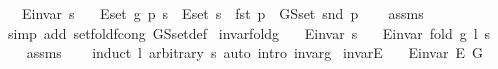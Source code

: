 \begin{isabellebody}
\ \ \ {\isachardoublequoteopen}E{\isachardot}{\kern0pt}invar\ s{\isachardoublequoteclose}\isanewline
\ \ \ {\isachardoublequoteopen}E{\isachardot}{\kern0pt}set\ {\isacharparenleft}{\kern0pt}g\ p\ s{\isacharparenright}{\kern0pt}\ {\isacharequal}{\kern0pt}\ E{\isachardot}{\kern0pt}set\ s\ {\isasymunion}\ {\isacharbraceleft}{\kern0pt}fst\ p{\isacharbraceright}{\kern0pt}\ {\isasymtimes}\ G{\isachardot}{\kern0pt}S{\isachardot}{\kern0pt}set\ {\isacharparenleft}{\kern0pt}snd\ p{\isacharparenright}{\kern0pt}{\isachardoublequoteclose}%
\endisataginvisible
{\isafoldinvisible}%
%
\isadeliminvisible
%
\endisadeliminvisible
\isanewline
%
\isadelimproof
\ \ %
\endisadelimproof
%
\isatagproof
{}\isamarkupfalse%
\ assms\isanewline
\ \ \isamarkupfalse%
\ {\isacharparenleft}{\kern0pt}simp\ add{\isacharcolon}{\kern0pt}\ set{\isacharunderscore}{\kern0pt}fold{\isacharunderscore}{\kern0pt}f{\isacharunderscore}{\kern0pt}cong\ G{\isachardot}{\kern0pt}S{\isachardot}{\kern0pt}set{\isacharunderscore}{\kern0pt}def{\isacharparenright}{\kern0pt}%
\endisatagproof
{\isafoldproof}%
%
\isadelimproof
%
\endisadelimproof
\isanewline
%
\isadeliminvisible
\isanewline
%
\endisadeliminvisible
%
\isataginvisible
{}\isamarkupfalse%
\ invar{\isacharunderscore}{\kern0pt}fold{\isacharunderscore}{\kern0pt}g{\isacharcolon}{\kern0pt}\isanewline
\ \ \ {\isachardoublequoteopen}E{\isachardot}{\kern0pt}invar\ s{\isachardoublequoteclose}\isanewline
\ \ \ {\isachardoublequoteopen}E{\isachardot}{\kern0pt}invar\ {\isacharparenleft}{\kern0pt}fold\ g\ l\ s{\isacharparenright}{\kern0pt}{\isachardoublequoteclose}%
\endisataginvisible
{\isafoldinvisible}%
%
\isadeliminvisible
%
\endisadeliminvisible
\isanewline
%
\isadelimproof
\ \ %
\endisadelimproof
%
\isatagproof
{}\isamarkupfalse%
\ assms\isanewline
\ \ \isamarkupfalse%
\ {\isacharparenleft}{\kern0pt}induct\ l\ arbitrary{\isacharcolon}{\kern0pt}\ s{\isacharparenright}{\kern0pt}\ {\isacharparenleft}{\kern0pt}auto\ intro{\isacharcolon}{\kern0pt}\ invar{\isacharunderscore}{\kern0pt}g{\isacharparenright}{\kern0pt}%
\endisatagproof
{\isafoldproof}%
%
\isadelimproof
%
\endisadelimproof
\isanewline
%
\isadeliminvisible
\isanewline
%
\endisadeliminvisible
%
\isataginvisible
{}\isamarkupfalse%
\ invar{\isacharunderscore}{\kern0pt}E{\isacharcolon}{\kern0pt}\isanewline
\ \ \ {\isachardoublequoteopen}E{\isachardot}{\kern0pt}invar\ {\isacharparenleft}{\kern0pt}E\ G{\isacharparenright}{\kern0pt}{\isachardoublequoteclose}%

\end{isabellebody}
